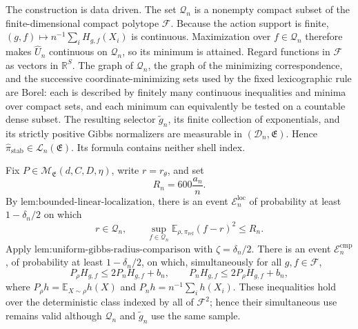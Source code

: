 The construction is data driven. The set \(\mathcal Q_n\) is a nonempty compact subset of the finite-dimensional compact polytope \(\mathcal F\). Because the action support is finite, \((g,f)\mapsto n^{-1}\sum_iH_{g,f}(X_i)\) is continuous. Maximization over \(f\in\mathcal Q_n\) therefore makes \(\widehat U_n\) continuous on \(\mathcal Q_n\), so its minimum is attained. Regard functions in \(\mathcal F\) as vectors in \(\mathbb R^S\). The graph of \(\mathcal Q_n\), the graph of the minimizing correspondence, and the successive coordinate-minimizing sets used by the fixed lexicographic rule are Borel: each is described by finitely many continuous inequalities and minima over compact sets, and each minimum can equivalently be tested on a countable dense subset. The resulting selector \(\widetilde g_n\), its finite collection of exponentials, and its strictly positive Gibbs normalizers are measurable in \((\mathcal D_n,\mathfrak E)\). Hence \(\widehat\pi_{\mathrm{stab}}\in\mathcal L_n(\mathfrak E)\). Its formula contains neither shell index.

Fix \(P\in\mathcal M_{\mathfrak E}(d,C,D,\eta)\), write \(r=r_\theta\), and set
\[
R_n=600\frac{a_n}{n}.
\]
By \(\text{lem:bounded-linear-localization}\), there is an event \(\mathcal E_n^{\mathrm{loc}}\) of probability at least \(1-\delta_n/2\) on which
\[
r\in\mathcal Q_n,
\qquad
\sup_{f\in\mathcal Q_n}\mathbb E_{\rho,\pi_{\mathrm{ref}}}(f-r)^2\le R_n.
\]
Apply \(\text{lem:uniform-gibbs-radius-comparison}\) with \(\zeta=\delta_n/2\). There is an event \(\mathcal E_n^{\mathrm{cmp}}\), of probability at least \(1-\delta_n/2\), on which, simultaneously for all \(g,f\in\mathcal F\),
\[
P_\rho H_{g,f}\le2P_nH_{g,f}+b_n,
\qquad
P_nH_{g,f}\le2P_\rho H_{g,f}+b_n,
\]
where \(P_\rho h=\mathbb E_{X\sim\rho}h(X)\) and \(P_nh=n^{-1}\sum_ih(X_i)\). These inequalities hold over the deterministic class indexed by all of \(\mathcal F^2\); hence their simultaneous use remains valid although \(\mathcal Q_n\) and \(\widetilde g_n\) use the same sample.

